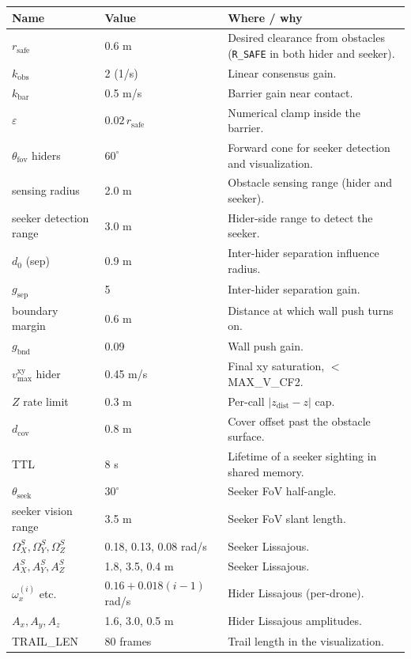 \documentclass[11pt,a4paper]{article}
\newcommand{\code}[1]{\texttt{#1}}
\begin{document}
\begin{longtable}{p{4.5cm}p{2.2cm}p{8cm}}
\toprule
\textbf{Name} & \textbf{Value} & \textbf{Where / why} \\
\midrule
$r_\mathrm{safe}$ & 0.6 m & Desired clearance from obstacles
(\code{R\_SAFE} in both hider and seeker). \\
$k_\mathrm{obs}$ & 2 (1/s) & Linear consensus gain. \\
$k_\mathrm{bar}$ & 0.5 m/s & Barrier gain near contact. \\
$\varepsilon$ & $0.02\,r_\mathrm{safe}$ & Numerical clamp inside the barrier. \\
$\theta_\mathrm{fov}$ hiders & $60^\circ$ & Forward cone for seeker detection
and visualization. \\
sensing radius & 2.0 m & Obstacle sensing range (hider and seeker). \\
seeker detection range & 3.0 m & Hider-side range to detect the seeker. \\
$d_0$ (sep) & 0.9 m & Inter-hider separation influence radius. \\
$g_\mathrm{sep}$ & 5 & Inter-hider separation gain. \\
boundary margin & 0.6 m & Distance at which wall push turns on. \\
$g_\mathrm{bnd}$ & 0.09 & Wall push gain. \\
$v_\mathrm{max}^\mathrm{xy}$ hider & 0.45 m/s & Final xy saturation, $< $ MAX\_V\_CF2. \\
$Z$ rate limit & 0.3 m & Per-call $|z_\mathrm{dist} - z|$ cap. \\
$d_\mathrm{cov}$ & 0.8 m & Cover offset past the obstacle surface. \\
TTL & 8 s & Lifetime of a seeker sighting in shared memory. \\
$\theta_\mathrm{seek}$ & $30^\circ$ & Seeker FoV half-angle. \\
seeker vision range & 3.5 m & Seeker FoV slant length. \\
$\Omega_X^S, \Omega_Y^S, \Omega_Z^S$ & 0.18, 0.13, 0.08 rad/s & Seeker Lissajous. \\
$A_X^S, A_Y^S, A_Z^S$ & 1.8, 3.5, 0.4 m & Seeker Lissajous. \\
$\omega_x^{(i)}$ etc. & $0.16 + 0.018(i-1)$ rad/s & Hider Lissajous (per-drone). \\
$A_x, A_y, A_z$ & 1.6, 3.0, 0.5 m & Hider Lissajous amplitudes. \\
TRAIL\_LEN & 80 frames & Trail length in the visualization. \\
\bottomrule
\end{longtable}
\end{document}
